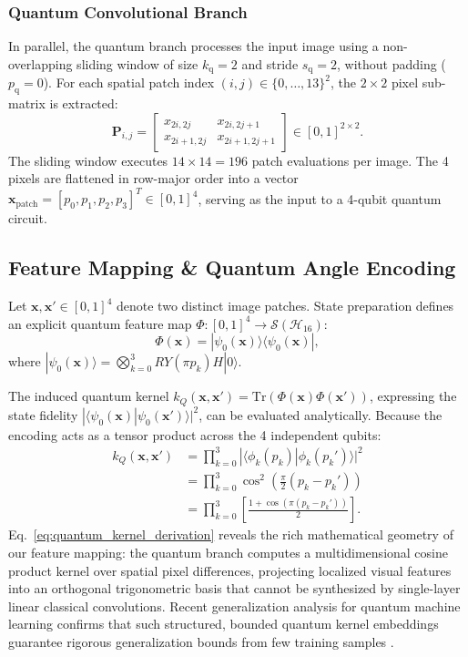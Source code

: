 \documentclass[journal]{IEEEtran}
\begin{document}
\subsubsection{Quantum Convolutional Branch}
In parallel, the quantum branch processes the input image using a non-overlapping sliding window of size $k_{\mathrm{q}} = 2$ and stride $s_{\mathrm{q}} = 2$, without padding ($p_{\mathrm{q}} = 0$). For each spatial patch index $(i, j) \in \{0, \dots, 13\}^2$, the $2 \times 2$ pixel sub-matrix is extracted:
\begin{equation}
\mathbf{P}_{i,j} = \begin{bmatrix} x_{2i, 2j} & x_{2i, 2j+1} \\ x_{2i+1, 2j} & x_{2i+1, 2j+1} \end{bmatrix} \in [0, 1]^{2 \times 2}.
\label{eq:patch_extraction}
\end{equation}
The sliding window executes $14 \times 14 = 196$ patch evaluations per image. The 4 pixels are flattened in row-major order into a vector $\mathbf{x}_{\mathrm{patch}} = [p_0, p_1, p_2, p_3]^T \in [0, 1]^4$, serving as the input to a 4-qubit quantum circuit.

\subsection{Feature Mapping \& Quantum Angle Encoding}
Let $\mathbf{x}, \mathbf{x}' \in [0, 1]^4$ denote two distinct image patches. State preparation defines an explicit quantum feature map $\Phi: [0, 1]^4 \to \mathcal{S}(\mathcal{H}_{16})$:
\begin{equation}
\Phi(\mathbf{x}) = |\psi_0(\mathbf{x})\rangle \langle \psi_0(\mathbf{x})|,
\label{eq:feature_map_density}
\end{equation}
where $|\psi_0(\mathbf{x})\rangle = \bigotimes_{k=0}^3 RY(\pi p_k) H |0\rangle$. 

The induced quantum kernel $k_Q(\mathbf{x}, \mathbf{x}') = \mathrm{Tr}(\Phi(\mathbf{x}) \Phi(\mathbf{x}'))$, expressing the state fidelity $|\langle \psi_0(\mathbf{x}) | \psi_0(\mathbf{x}') \rangle|^2$, can be evaluated analytically.
Because the encoding acts as a tensor product across the 4 independent qubits:
\begin{align}
k_Q(\mathbf{x}, \mathbf{x}') &= \prod_{k=0}^3 |\langle \phi_k(p_k) | \phi_k(p_k') \rangle|^2 \nonumber \\
&= \prod_{k=0}^3 \cos^2\left(\frac{\pi}{2}(p_k - p_k')\right) \nonumber \\
&= \prod_{k=0}^3 \left[ \frac{1 + \cos(\pi(p_k - p_k'))}{2} \right].
\label{eq:quantum_kernel_derivation}
\end{align}
Eq.~\eqref{eq:quantum_kernel_derivation} reveals the rich mathematical geometry of our feature mapping: the quantum branch computes a multidimensional cosine product kernel over spatial pixel differences, projecting localized visual features into an orthogonal trigonometric basis that cannot be synthesized by single-layer linear classical convolutions. Recent generalization analysis for quantum machine learning confirms that such structured, bounded quantum kernel embeddings guarantee rigorous generalization bounds from few training samples \cite{caro2025generalization}.
\end{document}
